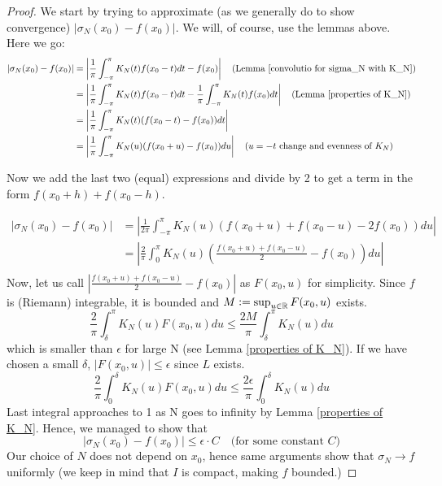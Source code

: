 \documentclass[12pt]{amsart}
\theoremstyle{definition}
\begin{document}
\begin{proof}
We start by trying to approximate (as we generally do to show convergence) $|\sigma_N(x_0) - f(x_0)|$. We will, of course, use the lemmas above. Here we go:
\begin{align*}
|\sigma_N(x_0) - f(x_0)| &= \left|\frac{1}{\pi} \int_{-\pi}^{\pi} K_N(t)f(x_0-t)dt - f(x_0)\right| \quad\text{(Lemma \ref{convolutio for sigma_N with K_N})} \\
&= \left|\frac{1}{\pi} \int_{-\pi}^{\pi} K_N(t)f(x_0-t)dt - \frac{1}{\pi} \int_{-\pi}^{\pi} K_N(t)f(x_0)dt\right| \quad\text{(Lemma \ref{properties of K_N})} \\
&= \left|\frac{1}{\pi} \int_{-\pi}^{\pi} K_N(t)(f(x_0-t) - f(x_0))dt \right|\\
&= \left|\frac{1}{\pi} \int_{-\pi}^{\pi} K_N(u)(f(x_0+u) - f(x_0))du \right| \quad\text{($u = -t$ change and evenness of $K_N$)}\\
\end{align*}


Now we add the last two (equal) expressions and divide by 2 to get a term in the form $f(x_0 + h) + f(x_0 - h)$.


\begin{align*}
    |\sigma_N(x_0) - f(x_0)| &= \left|\frac{1}{2\pi} \int_{-\pi}^{\pi} K_N(u)(f(x_0+u) + f(x_0 - u) - 2f(x_0))du \right| \\
    &= \left|\frac{2}{\pi} \int_{0}^{\pi} K_N(u)(\frac{f(x_0+u) + f(x_0 - u)}{2} - f(x_0))du \right| \\
\end{align*}
Now, let us call $|\frac{f(x_0+u) + f(x_0 - u)}{2} - f(x_0)|$ as $F(x_0,u)$ for simplicity. Since \(f\) is (Riemann) integrable, it is bounded and $M \vcentcolon = \sup_{u \in \mathbb{R}} F(x_0,u)$ exists.
\[
\frac{2}{\pi} \int_{\delta}^{\pi} K_N(u)F(x_0,u)du \leq \frac{2M}{\pi} \int_{\delta}^{\pi} K_N(u)du
\]
which is smaller than $\epsilon$ for large N (see Lemma \ref{properties of K_N}). If we have chosen a small $\delta$, $|F(x_0, u)| \leq \epsilon$ since $L$ exists.
\[
\frac{2}{\pi} \int_{0}^{\delta} K_N(u)F(x_0,u)du \leq \frac{2\epsilon}{\pi} \int_{0}^{\delta} K_N(u)du
\]
Last integral approaches to 1 as N goes to infinity by Lemma \ref{properties of K_N}. Hence, we managed to show that
\[
|\sigma_N(x_0) - f(x_0)| \leq \epsilon \cdot C \quad\text{(for some constant $C$)}
\]
Our choice of $N$ does not depend on $x_0$, hence same arguments show that $\sigma_N \to f$ uniformly (we keep in mind that $I$ is compact, making \(f\) bounded.)
\end{proof}
\end{document}
